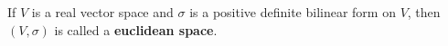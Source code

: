 If $V$ is a real vector space and $\sigma$ is a positive definite bilinear form on $V$, then $(V, \sigma)$ is called a \textbf{euclidean space}.
